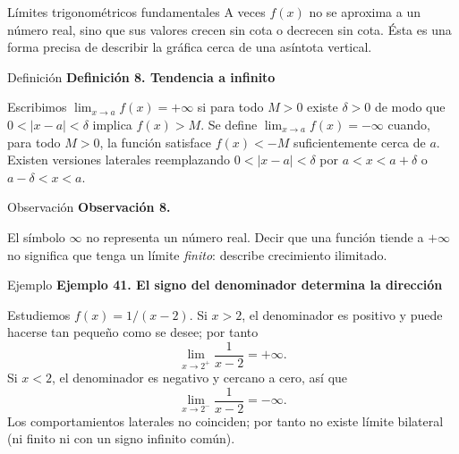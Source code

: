 \documentclass[12pt,aspectratio=169]{beamer}
\begin{document}
\begin{frame}[t,allowframebreaks]{Límites trigonométricos fundamentales}
A veces $f(x)$ no se aproxima a un número real, sino que sus valores crecen sin cota o decrecen sin cota. Ésta es una forma precisa de describir la gráfica cerca de una asíntota vertical.
\end{frame}


\begin{frame}[t,allowframebreaks]{Definición}
{\color{azul}\bfseries Definición 8. Tendencia a infinito}\par\medskip

Escribimos $\lim_{x\to a}f(x)=+\infty$ si para todo $M>0$ existe $\delta>0$ de modo que $0<|x-a|<\delta$ implica $f(x)>M$. Se define $\lim_{x\to a}f(x)=-\infty$ cuando, para todo $M>0$, la función satisface $f(x)<-M$ suficientemente cerca de $a$. Existen versiones laterales reemplazando $0<|x-a|<\delta$ por $a<x<a+\delta$ o $a-\delta<x<a$.
\end{frame}


\begin{frame}[t,allowframebreaks]{Observación}
{\color{azul}\bfseries Observación 8.}\par\medskip

El símbolo $\infty$ no representa un número real. Decir que una función tiende a $+\infty$ no significa que tenga un límite \emph{finito}: describe crecimiento ilimitado.
\end{frame}


\begin{frame}[t,allowframebreaks]{Ejemplo}
{\color{azul}\bfseries Ejemplo 41. El signo del denominador determina la dirección}\par\medskip

Estudiemos $f(x)=1/(x-2)$. Si $x>2$, el denominador es positivo y puede hacerse tan pequeño como se desee; por tanto
\[
 \boxed{\lim_{x\to2^+}\frac1{x-2}=+\infty.}
\]
Si $x<2$, el denominador es negativo y cercano a cero, así que
\[
 \boxed{\lim_{x\to2^-}\frac1{x-2}=-\infty.}
\]
Los comportamientos laterales no coinciden; por tanto no existe límite bilateral (ni finito ni con un signo infinito común).
\end{frame}
\end{document}
